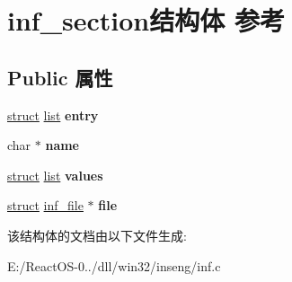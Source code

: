 \hypertarget{structinf__section}{}\section{inf\+\_\+section结构体 参考}
\label{structinf__section}
\subsection*{Public 属性}
\begin{DoxyCompactItemize}
\item 
\mbox{\label{structinf__section_a4d42a708578bd73811ce43c9f7e3b745}} 
\hyperlink{interfacestruct}{struct} \hyperlink{classlist}{list} {\bfseries entry}
\item 
\mbox{\label{structinf__section_aa2848b5aa4e7e2e4257c1e3c4cb6ac16}} 
char $\ast$ {\bfseries name}
\item 
\mbox{\label{structinf__section_a5fde52bfca5ec307c4782559a1a9a477}} 
\hyperlink{interfacestruct}{struct} \hyperlink{classlist}{list} {\bfseries values}
\item 
\mbox{\label{structinf__section_adc3f1b283cf3c38fe1c4a026a1595a1a}} 
\hyperlink{interfacestruct}{struct} \hyperlink{structinf__file}{inf\+\_\+file} $\ast$ {\bfseries file}
\end{DoxyCompactItemize}


该结构体的文档由以下文件生成\+:\begin{DoxyCompactItemize}
\item 
E\+:/\+React\+O\+S-\/0../dll/win32/inseng/inf.\+c\end{DoxyCompactItemize}
